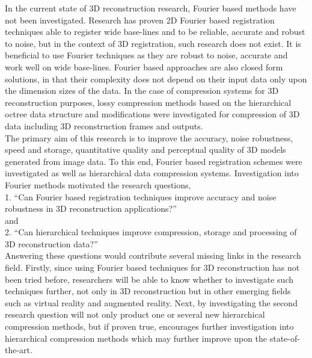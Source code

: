 In the current state of 3D reconstruction research, Fourier based methods have not been investigated. Research has proven 2D Fourier based registration techniques able to register wide base-lines and to be reliable, accurate and robust to noise, but in the context of 3D registration, such research does not exist. It is beneficial to use Fourier techniques as they are robust to noise, accurate and work well on wide base-lines. Fourier based approaches are also closed form solutions, in that their complexity does not depend on their input data only upon the dimension sizes of the data. In the case of compression systems for 3D reconstruction purposes, lossy compression methods based on the hierarchical octree data structure and modifications \cite{Lincoln13Interpolating} were investigated for compression of 3D data including 3D reconstruction frames and outputs. \\

The primary aim of this research is to improve the accuracy, noise robustness, speed and storage, quantitative quality and perceptual quality of 3D models generated from image data. To this end, Fourier based registration schemes were investigated as well as hierarchical data compression systems. Investigation into Fourier methods motivated the research questions, \\

1. ``Can Fourier based registration techniques improve accuracy and noise robustness in 3D reconstruction applications?'' \\

and \\

2. ``Can hierarchical techniques improve compression, storage and processing of 3D reconstruction data?'' \\

Answering these questions would contribute several missing links in the research field. Firstly, since using Fourier based techniques for 3D reconstruction has not been tried before, researchers will be able to know whether to investigate such techniques further, not only in 3D reconstruction but in other emerging fields such as virtual reality and augmented reality. Next, by investigating the second research question will not only product one or several new hierarchical compression methods, but if proven true, encourages further investigation into hierarchical compression methods which may further improve upon the state-of-the-art.

